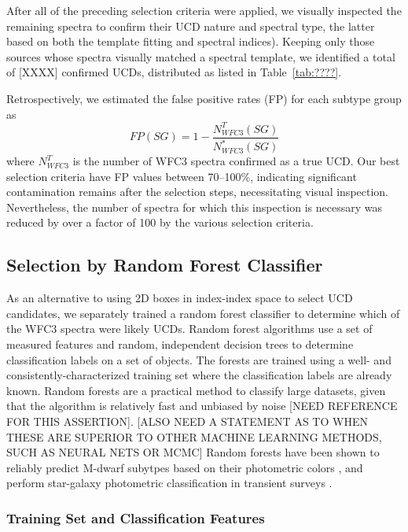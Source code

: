 \documentclass[manuscript]{aastex63}
\begin{document}
After all of the preceding selection criteria were applied, we visually inspected the remaining spectra to confirm their UCD nature and spectral type, the latter based on both the template fitting and spectral indices). Keeping only those sources whose spectra visually matched a spectral template, we identified a total of [XXXX] confirmed UCDs, distributed as listed in Table~\ref{tab:????}.

Retrospectively, we estimated the false positive rates (FP) for each subtype group as 
\begin{equation}
FP(SG) = 1-\frac{N_{WFC3}^T(SG)}{N_{WFC3}^*(SG)}
\end{equation} 
where $N_{WFC3}^T$ is the number of WFC3 spectra confirmed as a true UCD. Our best selection criteria have FP values between 70--100\%, indicating significant contamination remains after the selection steps, necessitating visual inspection.  
Nevertheless, the number of spectra for which this inspection  is necessary was reduced by over a factor of 100 by the various selection criteria. 


\subsection{Selection by Random Forest Classifier}

As an alternative to using 2D boxes in index-index space to select UCD candidates, we separately trained a random forest classifier to determine which of the WFC3 spectra were likely UCDs.
Random forest algorithms use a set of measured features and random, independent decision trees to determine classification labels on a set of objects. The forests are trained using a well- and consistently-characterized training set where the classification labels are already known.  Random forests are a practical method to classify large datasets, given that the algorithm is relatively fast and unbiased by noise [NEED REFERENCE FOR THIS ASSERTION]. [ALSO NEED A STATEMENT AS TO WHEN THESE ARE SUPERIOR TO OTHER MACHINE LEARNING METHODS, SUCH AS NEURAL NETS OR MCMC]
Random forests have been shown to reliably predict M-dwarf subytpes based on their photometric colors \citep{2019arXiv190505900H}, and perform star-galaxy photometric classification in transient surveys \citep{2017AJ....153...73M}. 

\subsubsection{ Training Set and Classification Features}
\end{document}
